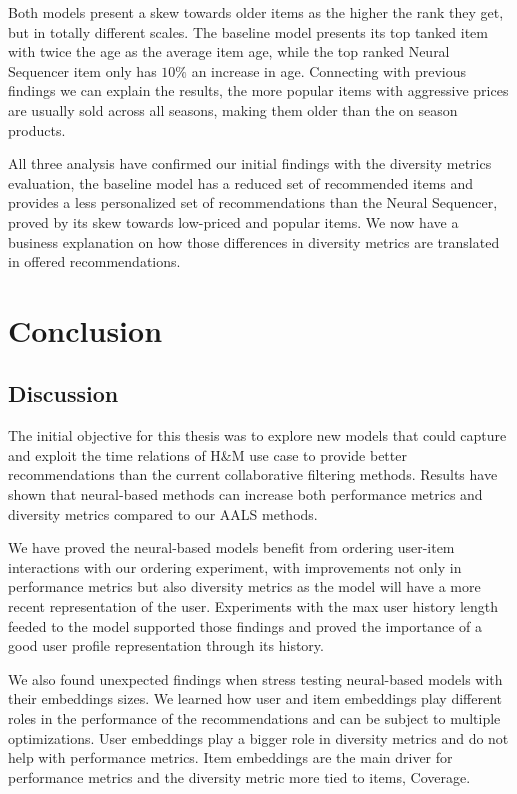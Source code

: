 \documentclass{kththesis}
\begin{document}
Both models present a skew towards older items as the higher the rank they get, but in totally different scales. The baseline model presents its top tanked item with twice the age as the average item age, while the top ranked Neural Sequencer item only has $10\%$ an increase in age. Connecting with previous findings we can explain the results, the more popular items with aggressive prices are usually sold across all seasons, making them older than the on season products. 

All three analysis have confirmed our initial findings with the diversity metrics evaluation, the baseline model has a reduced set of recommended items and provides a less personalized set of recommendations than the Neural Sequencer, proved by its skew towards low-priced and popular items. We now have a business explanation on how those differences in diversity metrics are translated in offered recommendations.

\chapter{Conclusion}
\section{Discussion}
The initial objective for this thesis was to explore new models that could capture and exploit the time relations of H\&M use case to provide better recommendations than the current collaborative filtering methods. Results have shown that neural-based methods can increase both performance metrics and diversity metrics compared to our AALS methods.

We have proved the neural-based models benefit from ordering user-item interactions with our ordering experiment, with improvements not only in performance metrics but also diversity metrics as the model will have a more recent representation of the user. Experiments with the max user history length feeded to the model supported those findings and proved the importance of a good user profile representation through its history. 

We also found unexpected findings when stress testing neural-based models with their embeddings sizes. We learned how user and item embeddings play different roles in the performance of the recommendations and can be subject to multiple optimizations. User embeddings play a bigger role in diversity metrics and do not help with performance metrics. Item embeddings are the main driver for performance metrics and the diversity metric more tied to items, Coverage.
\end{document}

